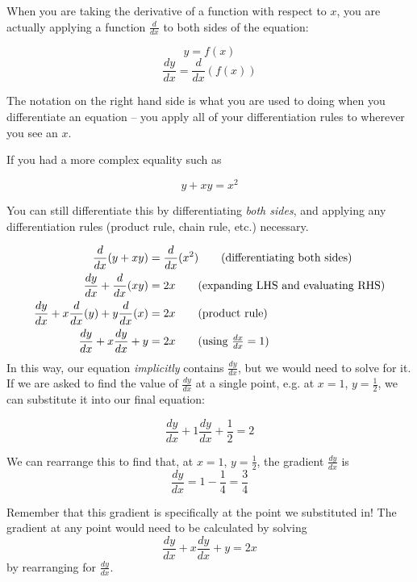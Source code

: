 When you are taking the derivative of a function with respect to $x$, you are actually applying a function $\frac{d}{dx}$ to both sides of the equation:

\[y = f(x)\]
\[\frac{dy}{dx} = \frac{d}{dx}(f(x))\]

The notation on the right hand side is what you are used to doing when you differentiate an equation -- you apply all of your differentiation rules to wherever you see an $x$.

If you had a more complex equality such as 

\[ y + xy = x^2\]

You can still differentiate this by differentiating \emph{both sides}, and applying any differentiation rules (product rule, chain rule, etc.) necessary.

\begin{align*}
    \frac{d}{dx}(y + xy) &= \frac{d}{dx}(x^2) \tag{differentiating both sides}\\
    \frac{dy}{dx} + \frac{d}{dx}(xy) &= 2x \tag{expanding LHS and evaluating RHS}\\
    \frac{dy}{dx} + x\frac{d}{dx}(y) + y\frac{d}{dx}(x)&= 2x \tag{product rule}\\
    \frac{dy}{dx} + x\frac{dy}{dx} + y&= 2x \tag{using $\frac{dx}{dx} = 1$}
\end{align*}
In this way, our equation \emph{implicitly} contains $\frac{dy}{dx}$, but we would need to solve for it. If we are asked to find the value of $\frac{dy}{dx}$ at a single point, e.g. at $x=1$, $y=\frac{1}{2}$, we can substitute it into our final equation:

\[ \frac{dy }{dx } + 1 \frac{dy }{dx} + \frac{1}{2} = 2\]

We can rearrange this to find that, at $x=1$, $y=\frac{1}{2}$, the gradient $\frac{dy}{dx}$ is 
\[\frac{dy}{dx} = 1- \frac{1}{4} = \frac{3}{4}\]

Remember that this gradient is specifically at the point we substituted in! The gradient at any point would need to be calculated by solving 
\[\frac{dy}{dx} + x\frac{dy}{dx} + y= 2x  \]
by rearranging for $\frac{dy }{dx}$.

